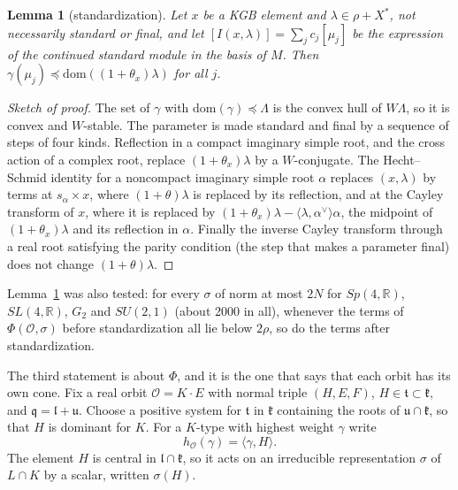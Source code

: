 \documentclass[11pt,leqno]{article}
\newtheorem{lemma}[equation]{Lemma}
\theoremstyle{definition}
\numberwithin{equation}{section}
\newcommand{\Ob}{\mathcal O}
\newcommand{\fk}{\mathfrak k}
\newcommand{\fq}{\mathfrak q}
\newcommand{\fu}{\mathfrak u}
\newcommand{\fl}{\mathfrak l}
\newcommand{\ft}{\mathfrak t}
\newcommand{\R}{\mathbb R}
\newcommand{\ch}[1]{#1^\vee}
\newcommand{\dom}{\mathrm{dom}}
\begin{document}
\begin{lemma}[standardization]
\label{l:std}
Let $x$ be a KGB element and $\lambda\in\rho+X^*$, not necessarily standard
or final, and let $[I(x,\lambda)]=\sum_j c_j[\mu_j]$ be the expression of the
continued standard module in the basis of $M$.  Then
$\gamma(\mu_j)\preceq\dom((1+\theta_x)\lambda)$ for all $j$.
\end{lemma}

\begin{proof}[Sketch of proof]
The set of $\gamma$ with $\dom(\gamma)\preceq\Lambda$ is the convex hull of
$W\Lambda$, so it is convex and $W$-stable.  The parameter is made standard
and final by a sequence of steps of four kinds.  Reflection in a compact
imaginary simple root, and the cross action of a complex root, replace
$(1+\theta_x)\lambda$ by a $W$-conjugate.  The Hecht--Schmid identity for a
noncompact imaginary simple root $\alpha$ replaces $(x,\lambda)$ by terms
at $s_\alpha\times x$, where $(1+\theta)\lambda$ is replaced by its reflection,
and at the Cayley transform of $x$, where it is replaced by
$(1+\theta_x)\lambda-\langle\lambda,\ch\alpha\rangle\alpha$, the midpoint of
$(1+\theta_x)\lambda$ and its reflection in $\alpha$.  Finally the inverse
Cayley transform through a real root satisfying the parity condition (the
step that makes a parameter final) does not change $(1+\theta)\lambda$.
\end{proof}

Lemma~\ref{l:std} was also tested: for every $\sigma$ of norm at most $2N$
for $Sp(4,\R)$, $SL(4,\R)$, $G_2$ and $SU(2,1)$ (about 2000 in all), whenever
the terms of $\Phi(\Ob,\sigma)$ before standardization all lie below
$2\rho$, so do the terms after standardization.

The third statement is about $\Phi$, and it is the one that says that each
orbit has its own cone.  Fix a real orbit $\Ob=K\cdot E$ with normal triple
$(H,E,F)$, $H\in\ft\subset\fk$, and $\fq=\fl+\fu$.  Choose a positive
system for $\ft$ in $\fk$ containing the roots of $\fu\cap\fk$, so that $H$ is
dominant for $K$.  For a $K$-type with highest weight $\gamma$ write
\[
h_\Ob(\gamma)=\langle\gamma,H\rangle .
\]
The element $H$ is central in $\fl\cap\fk$, so it acts on an irreducible
representation $\sigma$ of $L\cap K$ by a scalar, written $\sigma(H)$.
\end{document}
